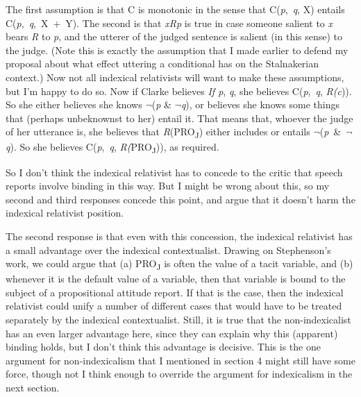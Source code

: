 The first assumption is that C is monotonic in the sense that C(\textit{p},~\textit{q}, X) entails C(\textit{p},~\textit{q},~X~+~Y). The second is that \textit{xRp} is true in case someone salient to \textit{x} bears \textit{R} to \textit{p}, and the utterer of the judged sentence is salient (in this sense) to the judge. (Note this is exactly the assumption that I made earlier to defend my proposal about what effect uttering a conditional has on the Stalnakerian context.) Now not all indexical relativists will want to make these assumptions, but I'm happy to do so. Now if Clarke believes \textit{If p}, \textit{q}, she believes C(\textit{p},~\textit{q}, \textit{R(c})). So she either believes she knows \(\neg\){}(\textit{p} \& \(\neg\){}\textit{q}), or believes she knows some things that (perhaps unbeknownst to her) entail it. That means that, whoever the judge of her utterance is, she believes that \textit{R}(PRO\textsubscript{J}) either includes or entails \(\neg\){}(\textit{p}~\&~\(\neg\){}\textit{q}). So she believes C(\textit{p},~\textit{q}, \textit{R(}PRO\textsubscript{J})), as required.

So I don't think the indexical relativist has to concede to the critic that speech reports involve binding in this way. But I might be wrong about this, so my second and third responses concede this point, and argue that it doesn't harm the indexical relativist position. 

The second response is that even with this concession, the indexical relativist has a small advantage over the indexical contextualist. Drawing on Stephenson's work, we could argue that (a) PRO\textsubscript{J} is often the value of a tacit variable, and (b) whenever it is the default value of a variable, then that variable is bound to the subject of a propositional attitude report. If that is the case, then the indexical relativist could unify a number of different cases that would have to be treated separately by the indexical contextualist. Still, it is true that the non-indexicalist has an even larger advantage here, since they can explain why this (apparent) binding holds, but I don't think this advantage is decisive. This is the one argument for non-indexicalism that I mentioned in section 4 might still have some force, though not I think enough to override the argument for indexicalism in the next section.


